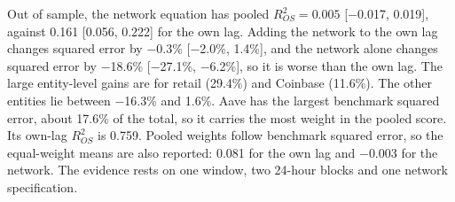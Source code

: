 \documentclass[referee,pdflatex,sn-mathphys-ay]{sn-jnl}
\theoremstyle{thmstyleone}%
\theoremstyle{thmstyletwo}%
\theoremstyle{thmstylethree}%
\begin{document}
Out of sample, the network equation has pooled $R^2_{OS}=0.005$ [$-$0.017, 0.019], against
0.161 [0.056, 0.222] for the own lag. Adding the network to the own lag changes squared error by
$-$0.3\% [$-$2.0\%, 1.4\%], and the network alone changes squared error by
$-$18.6\% [$-$27.1\%, $-$6.2\%], so it is worse than the own lag. The large entity-level gains are for retail
(29.4\%) and Coinbase (11.6\%). The other entities lie between
$-$16.3\% and 1.6\%. Aave has the largest benchmark squared error, about 17.6\% of
the total, so it carries the most weight in the pooled score. Its own-lag $R^2_{OS}$ is 0.759. Pooled weights
follow benchmark squared error, so the equal-weight means are also reported: 0.081 for the own lag and
$-$0.003 for the network. The evidence rests on one window, two 24-hour blocks and one network specification.
\end{document}
